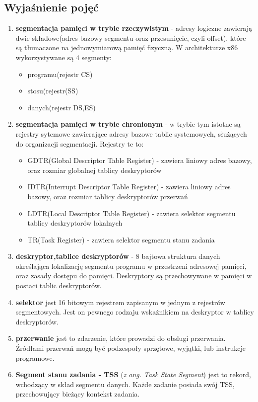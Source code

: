 \documentclass[a4paper,12pt]{article}
\begin{document}
	\subsection{Wyjaśnienie pojęć}
		\begin{enumerate}
				\item{\textbf{segmentacja pamięci w trybie rzeczywistym} - adresy logiczne zawierają dwie składowe(adres bazowy segmentu oraz przesunięcie, czyli offset), które są tłumaczone na jednowymiarową pamięć fizyczną. W architekturze x86 wykorzystywane są 4 segmenty:}
					\begin{itemize}
					\item{programu(rejestr CS)}
					\item{stosu(rejestr(SS)}
					\item{danych(rejestr DS,ES)}
					\end{itemize}
				\item{\textbf{segmentacja pamięci w trybie chronionym} - w trybie tym istotne są rejestry sytemowe zawierające adresy bazowe tablic systemowych, służących do organizacji segmentacji. Rejestry te to:}
					\begin{itemize}
						\item{GDTR(Global Descriptor Table Register) - zawiera liniowy adres bazowy, oraz rozmiar globalnej tablicy deskryptorów}
						\item{IDTR(Interrupt Descriptor Table Register) - zawiera liniowy adres bazowy, oraz rozmiar tablicy deskryptorów przerwań}
						\item{LDTR(Local Descriptor Table Register) - zawiera selektor segmentu tablicy deskryptorów lokalnych}
						\item{TR(Task Register) - zawiera selektor segmentu stanu zadania}
					\end{itemize}
				\item {\textbf{deskryptor,tablice deskryptorów }- 8 bajtowa struktura danych określająca lokalizację segmentu programu w przestrzeni adresowej pamięci, oraz zasady dostępu do pamięci. Deskryptory są przechowywane w pamięci w postaci tablic deskryptorów.}
				\item{\textbf{selektor} jest 16 bitowym rejestrem zapisanym w jednym z rejestrów segmentowych. Jest on pewnego rodzaju wskaźnikiem na deskryptor w tablicy deskryptorów.}
					
				\item{\textbf{przerwanie} jest to zdarzenie, które prowadzi do obslugi przerwania. Źródłami przerwań mogą być podzespoły sprzętowe, wyjątki, lub instrukcje programowe. }
				\item{\textbf{Segment stanu zadania - TSS} (\textit{z ang. Task State Segment}) jest to rekord, wchodzący w skład segmentu danych. Każde zadanie posiada swój TSS, przechowujący bieżący kontekst zadania.}
		\end{enumerate}
	
\end{document}
